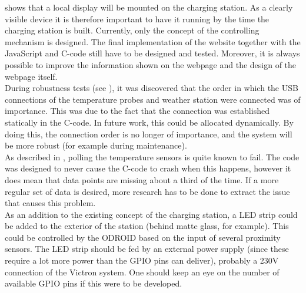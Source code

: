  shows that a local display will be mounted on the charging station. As a clearly visible device it is therefore important to have it running by the time the charging station is built. Currently, only the concept of the controlling mechanism is designed. The final implementation of the website together with the JavaScript and C-code still have to be designed and tested. Moreover, it is always possible to improve the information shown on the webpage and the design of the webpage itself.\\

During robustness tests (see ), it was discovered that the order in which the USB connections of the temperature probes and weather station were connected was of importance. This was due to the fact that the connection was established statically in the C-code. In future work, this could be allocated dynamically. By doing this, the connection order is no longer of importance, and the system will be more robust (for example during maintenance).\\

As described in , polling the temperature sensors is quite known to fail. The code was designed to never cause the C-code to crash when this happens, however it does mean that data points are missing about a third of the time. If a more regular set of data is desired, more research has to be done to extract the issue that causes this problem.\\

As an addition to the existing concept of the charging station, a LED strip could be added to the exterior of the station (behind matte glass, for example). This could be controlled by the ODROID based on the input of several proximity sensors. The LED strip should be fed by an external power supply (since these require a lot more power than the GPIO pins can deliver), probably a 230V connection of the Victron system. One should keep an eye on the number of available GPIO pins if this were to be developed.

